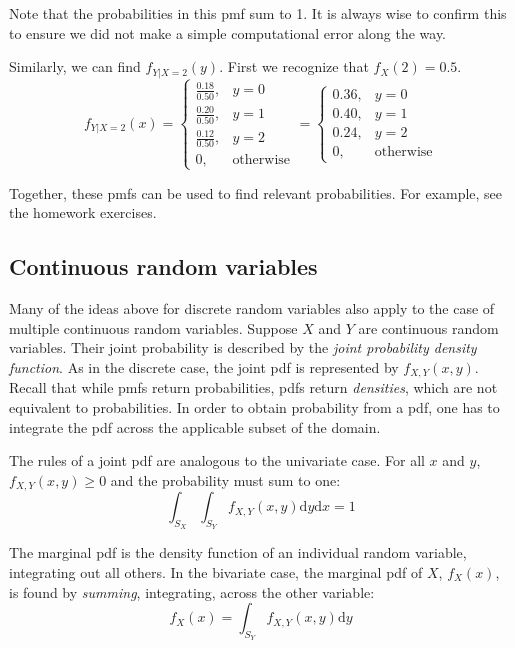\documentclass[
  letterpaper,
  DIV=11,
  numbers=noendperiod]{scrreprt}
\begin{document}
Note that the probabilities in this pmf sum to 1. It is always wise to
confirm this to ensure we did not make a simple computational error
along the way.

Similarly, we can find \(f_{Y|X=2}(y)\). First we recognize that
\(f_X(2)=0.5\). \[
\renewcommand{\arraystretch}{1.25} 
f_{Y|X=2}(x)=\left\{\begin{array}{ll} \frac{0.18}{0.50}, & y=0 \\
\frac{0.20}{0.50}, & y=1 \\
\frac{0.12}{0.50}, & y=2 \\
0, & \mbox{otherwise} 
\end{array}\right. = \left\{\begin{array}{ll} 0.36, & y=0 \\
0.40, & y=1 \\
0.24, & y=2 \\
0, & \mbox{otherwise} 
\end{array}\right.
\]

Together, these pmfs can be used to find relevant probabilities. For
example, see the homework exercises.

\subsection{Continuous random
variables}\label{continuous-random-variables-2}

Many of the ideas above for discrete random variables also apply to the
case of multiple continuous random variables. Suppose \(X\) and \(Y\)
are continuous random variables. Their joint probability is described by
the \emph{joint probability density function}. As in the discrete case,
the joint pdf is represented by \(f_{X,Y}(x,y)\). Recall that while pmfs
return probabilities, pdfs return \emph{densities}, which are not
equivalent to probabilities. In order to obtain probability from a pdf,
one has to integrate the pdf across the applicable subset of the domain.

The rules of a joint pdf are analogous to the univariate case. For all
\(x\) and \(y\), \(f_{X,Y}(x,y)\geq 0\) and the probability must sum to
one: \[
\int_{S_X}\int_{S_Y}f_{X,Y}(x,y)\mbox{d}y \mbox{d}x = 1
\]

The marginal pdf is the density function of an individual random
variable, integrating out all others. In the bivariate case, the
marginal pdf of \(X\), \(f_X(x)\), is found by \emph{summing},
integrating, across the other variable: \[
f_X(x)=\int_{S_Y}f_{X,Y}(x,y)\mbox{d}y
\]
\end{document}
